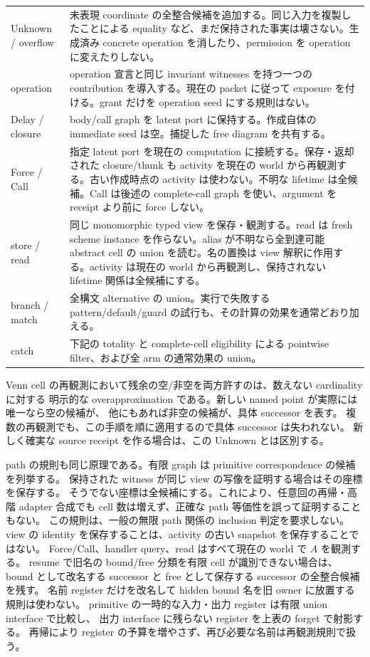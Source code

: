\documentclass[11pt,a4paper]{article}
\theoremstyle{remark}
\begin{document}
\begin{longtable}{p{}p{}}
Unknown / overflow & 未表現 coordinate の全整合候補を追加する。同じ入力を複製したことによる equality など、まだ保持された事実は壊さない。生成済み concrete operation を消したり、permission を operation に変えたりしない。\\
operation & operation 宣言と同じ invariant witnesses を持つ一つの contribution を導入する。現在の packet に従って exposure を付ける。grant だけを operation seed にする規則はない。\\
Delay / closure & body/call graph を latent port に保持する。作成自体の immediate seed は空。捕捉した free diagram を共有する。\\
Force / Call & 指定 latent port を現在の computation に接続する。保存・返却された closure/thunk も activity を現在の world から再観測する。古い作成時点の activity は使わない。不明な lifetime は全候補。Call は後述の complete-call graph を使い、argument を receipt より前に force しない。\\
store / read & 同じ monomorphic typed view を保存・観測する。read は fresh scheme instance を作らない。alias が不明なら全到達可能 abstract cell の union を読む。名の置換は view 解釈に作用する。activity は現在の world から再観測し、保持されない lifetime 関係は全候補にする。\\
branch / match & 全構文 alternative の union。実行で失敗する pattern/default/guard の試行も、その計算の効果を通常どおり加える。\\
catch & 下記の totality と complete-cell eligibility による pointwise filter、および全 arm の通常効果の union。\\
\bottomrule
\end{longtable}

Venn cell の再観測において残余の空/非空を両方許すのは、数えない cardinality に対する
明示的な overapproximation である。新しい named point が実際には唯一なら空の候補が、
他にもあれば非空の候補が、具体 successor を表す。
複数の再観測でも、この手順を順に適用するので具体 successor は失われない。
新しく確実な source receipt を作る場合は、この Unknown とは区別する。

path の規則も同じ原理である。有限 graph は primitive correspondence の候補を列挙する。
保持された witness が同じ view の写像を証明する場合はその座標を保存する。
そうでない座標は全候補にする。これにより、任意回の再帰・高階 adapter 合成でも
cell 数は増えず、正確な path 等価性を誤って証明することもない。
この規則は、一般の無限 path 関係の inclusion 判定を要求しない。
view の identity を保存することは、activity の古い snapshot を保存することではない。
Force/Call、handler query、read はすべて現在の world で $A$ を観測する。
resume で旧名の bound/free 分類を有限 cell が識別できない場合は、
bound として改名する successor と free として保存する successor の全整合候補を残す。
名前 register だけを改名して hidden bound 名を旧 owner に放置する規則は使わない。
primitive の一時的な入力・出力 register は有限 union interface で比較し、
出力 interface に残らない register を上表の forget で射影する。
再帰により register の予算を増やさず、再び必要な名前は再観測規則で扱う。
\end{document}
